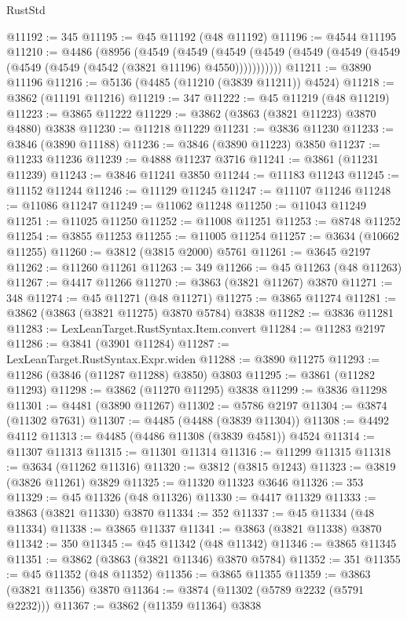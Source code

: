 \begin{lexlean}{RustStd}
\begin{coremodule}
@11192 := 345
@11195 := @45 @11192 (@48 @11192)
@11196 := @4544 @11195
@11210 := @4486
    (@8956
      (@4549
        (@4549
          (@4549 (@4549 (@4549 (@4549 (@4549 (@4549 (@4549 (@4542 (@3821 @11196) @4550)))))))))))
@11211 := @3890 @11196
@11216 := @5136 (@4485 (@11210 (@3839 @11211)) @4524)
@11218 := @3862 (@11191 @11216)
@11219 := 347
@11222 := @45 @11219 (@48 @11219)
@11223 := @3865 @11222
@11229 := @3862 (@3863 (@3821 @11223) @3870 @4880) @3838
@11230 := @11218 @11229
@11231 := @3836 @11230
@11233 := @3846 (@3890 @11188)
@11236 := @3846 (@3890 @11223) @3850
@11237 := @11233 @11236
@11239 := @4888 @11237 @3716
@11241 := @3861 (@11231 @11239)
@11243 := @3846 @11241 @3850
@11244 := @11183 @11243
@11245 := @11152 @11244
@11246 := @11129 @11245
@11247 := @11107 @11246
@11248 := @11086 @11247
@11249 := @11062 @11248
@11250 := @11043 @11249
@11251 := @11025 @11250
@11252 := @11008 @11251
@11253 := @8748 @11252
@11254 := @3855 @11253
@11255 := @11005 @11254
@11257 := @3634 (@10662 @11255)
@11260 := @3812 (@3815 @2000) @5761
@11261 := @3645 @2197
@11262 := @11260 @11261
@11263 := 349
@11266 := @45 @11263 (@48 @11263)
@11267 := @4417 @11266
@11270 := @3863 (@3821 @11267) @3870
@11271 := 348
@11274 := @45 @11271 (@48 @11271)
@11275 := @3865 @11274
@11281 := @3862 (@3863 (@3821 @11275) @3870 @5784) @3838
@11282 := @3836 @11281
@11283 := LexLeanTarget.RustSyntax.Item.convert
@11284 := @11283 @2197
@11286 := @3841 (@3901 @11284)
@11287 := LexLeanTarget.RustSyntax.Expr.widen
@11288 := @3890 @11275
@11293 := @11286 (@3846 (@11287 @11288) @3850) @3803
@11295 := @3861 (@11282 @11293)
@11298 := @3862 (@11270 @11295) @3838
@11299 := @3836 @11298
@11301 := @4481 (@3890 @11267)
@11302 := @5786 @2197
@11304 := @3874 (@11302 @7631)
@11307 := @4485 (@4488 (@3839 @11304))
@11308 := @4492 @4112
@11313 := @4485 (@4486 @11308 (@3839 @4581)) @4524
@11314 := @11307 @11313
@11315 := @11301 @11314
@11316 := @11299 @11315
@11318 := @3634 (@11262 @11316)
@11320 := @3812 (@3815 @1243)
@11323 := @3819 (@3826 @11261) @3829
@11325 := @11320 @11323 @3646
@11326 := 353
@11329 := @45 @11326 (@48 @11326)
@11330 := @4417 @11329
@11333 := @3863 (@3821 @11330) @3870
@11334 := 352
@11337 := @45 @11334 (@48 @11334)
@11338 := @3865 @11337
@11341 := @3863 (@3821 @11338) @3870
@11342 := 350
@11345 := @45 @11342 (@48 @11342)
@11346 := @3865 @11345
@11351 := @3862 (@3863 (@3821 @11346) @3870 @5784)
@11352 := 351
@11355 := @45 @11352 (@48 @11352)
@11356 := @3865 @11355
@11359 := @3863 (@3821 @11356) @3870
@11364 := @3874 (@11302 (@5789 @2232 (@5791 @2232)))
@11367 := @3862 (@11359 @11364) @3838

\end{coremodule}
\end{lexlean}
